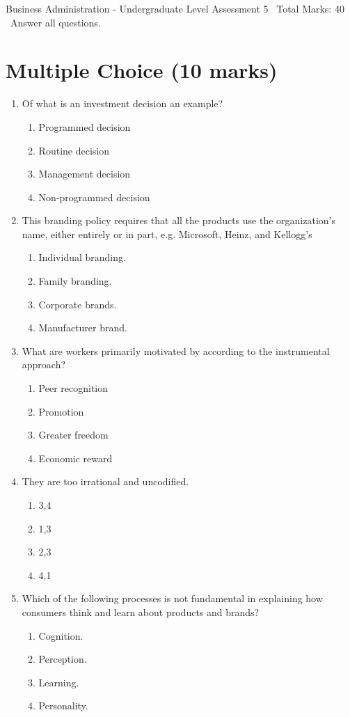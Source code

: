 \documentclass[12pt]{article}
\begin{document}
\begin{center}
Business Administration - Undergraduate Level Assessment 5 \
Total Marks: 40 \
Answer all questions.
\end{center}

\section*{Multiple Choice (10 marks)}
\begin{enumerate}[label=\arabic*.]
\item Of what is an investment decision an example?
\begin{enumerate}[label=(\alph*)]
    \item Programmed decision
    \item Routine decision
    \item Management decision
    \item Non-programmed decision
\end{enumerate}
\item This branding policy requires that all the products use the organization's name, either entirely or in part, e.g. Microsoft, Heinz, and Kellogg's
\begin{enumerate}[label=(\alph*)]
    \item Individual branding.
    \item Family branding.
    \item Corporate brands.
    \item Manufacturer brand.
\end{enumerate}
\item What are workers primarily motivated by according to the instrumental approach?
\begin{enumerate}[label=(\alph*)]
    \item Peer recognition
    \item Promotion
    \item Greater freedom
    \item Economic reward
\end{enumerate}
\item They are too irrational and uncodified.
\begin{enumerate}[label=(\alph*)]
    \item 3,4
    \item 1,3
    \item 2,3
    \item 4,1
\end{enumerate}
\item Which of the following processes is not fundamental in explaining how consumers think and learn about products and brands?
\begin{enumerate}[label=(\alph*)]
    \item Cognition.
    \item Perception.
    \item Learning.
    \item Personality.
\end{enumerate}
\end{enumerate}
\end{document}
